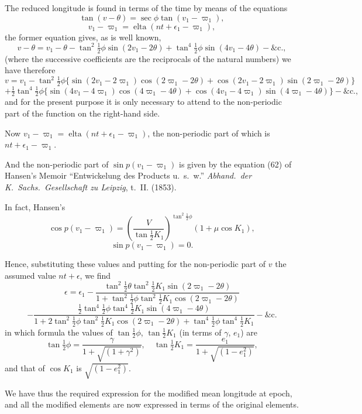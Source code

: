 \documentclass[12pt,a4paper]{article}
\theoremstyle{plain}
\theoremstyle{definition}
\begin{document}
The reduced longitude is found in terms of the time by means of the equations
\[
\tan(v - \theta) = \sec \phi \tan(v_1 - \varpi_1),
\]
\[
v_1 - \varpi_1 = \operatorname{elta}(nt + \epsilon_1 - \varpi_1),
\]
the former equation gives, as is well known,
\[
v - \theta = v_1 - \theta - \tan^2 \tfrac{1}{2}\phi \sin(2v_1 - 2\theta) + \tan^4 \tfrac{1}{2}\phi \sin(4v_1 - 4\theta) - \&\text{c.},
\]
(where the successive coefficients are the reciprocals of the natural numbers) we have therefore
\[
v = v_1 - \tan^2 \tfrac{1}{2}\phi \{\sin(2v_1 - 2\varpi_1)\cos(2\varpi_1 - 2\theta) + \cos(2v_1 - 2\varpi_1)\sin(2\varpi_1 - 2\theta)\}
\]
\[
+ \tfrac{1}{2} \tan^4 \tfrac{1}{2}\phi \{\sin(4v_1 - 4\varpi_1)\cos(4\varpi_1 - 4\theta) + \cos(4v_1 - 4\varpi_1)\sin(4\varpi_1 - 4\theta)\} - \&\text{c.},
\]
and for the present purpose it is only necessary to attend to the non-periodic part of the function on the right-hand side.

Now $v_1 - \varpi_1 = \operatorname{elta}(nt + \epsilon_1 - \varpi_1)$, the non-periodic part of which is $nt + \epsilon_1 - \varpi_1$.

And the non-periodic part of $\sin p(v_1 - \varpi_1)$ is given by the equation (62) of Hansen's Memoir ``Entwickelung des Products u.~s.~w.'' \textit{Abhand.\ der K.\ Sachs.\ Gesellschaft zu Leipzig}, t.~II. (1853).

In fact, Hansen's
\[
\cos p(v_1 - \varpi_1) = \left(\frac{V}{\tan \tfrac{1}{2}K_1}\right)^{\tan^2 \tfrac{1}{2}\phi} (1 + \mu \cos K_1),
\]
\[
\sin p(v_1 - \varpi_1) = 0.
\]

Hence, substituting these values and putting for the non-periodic part of $v$ the assumed value $nt + \epsilon$, we find
\[
\epsilon = \epsilon_1 - \frac{\tan^2 \tfrac{1}{2}\theta \tan^2 \tfrac{1}{2}K_1 \sin(2\varpi_1 - 2\theta)}{1 + \tan^2 \tfrac{1}{2}\phi \tan^2 \tfrac{1}{2}K_1 \cos(2\varpi_1 - 2\theta)}
\]
\[
- \frac{\frac{1}{2}\tan^4 \tfrac{1}{2}\phi \tan^4 \tfrac{1}{2}K_1 \sin(4\varpi_1 - 4\theta)}{1 + 2\tan^2 \tfrac{1}{2}\phi \tan^2 \tfrac{1}{2}K_1 \cos(2\varpi_1 - 2\theta) + \tan^4 \tfrac{1}{2}\phi \tan^4 \tfrac{1}{2}K_1} - \&\text{c.}
\]
in which formula the values of $\tan \tfrac{1}{2}\phi$, $\tan \tfrac{1}{2}K_1$ (in terms of $\gamma$, $e_1$) are
\[
\tan \tfrac{1}{2}\phi = \frac{\gamma}{1 + \sqrt{(1 + \gamma^2)}}, \quad \tan \tfrac{1}{2}K_1 = \frac{e_1}{1 + \sqrt{(1 - e_1^2)}},
\]
and that of $\cos K_1$ is $\sqrt{(1 - e_1^2)}$.

We have thus the required expression for the modified mean longitude at epoch, and all the modified elements are now expressed in terms of the original elements.
\end{document}
